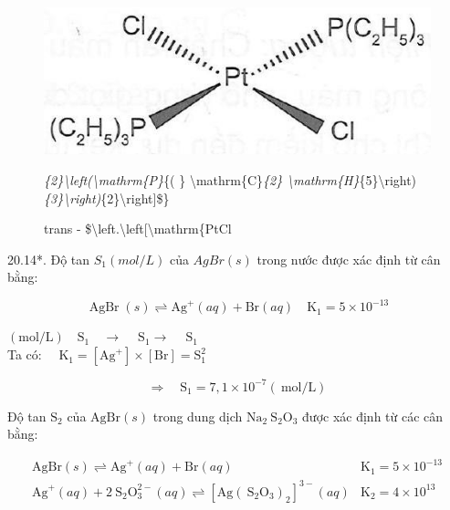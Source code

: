 \documentclass[10pt]{article}
\begin{document}
\begin{figure}[h]
\begin{center}
  \includegraphics[width=\textwidth]{2025_10_23_b4e16b74380d0f7e7700g-119(1)}
\captionsetup{labelformat=empty}
\caption{trans - \$\textbackslash left.\textbackslash left[\textbackslash mathrm\{PtCl}\textit{\{2\}\textbackslash left(\textbackslash mathrm\{P\}}\{( \} \textbackslash mathrm\{C\}\textit{\{2\} \textbackslash mathrm\{H\}}\{5\}\textbackslash right)\textit{\{3\}\textbackslash right)}\{2\}\textbackslash right]\$\}\end{center}
\end{figure}

20.14*. Độ tan $S_{1}(m o l / L)$ của $A g B r(s)$ trong nước được xác định từ cân bằng:

$$
\operatorname{AgBr}(s) \rightleftharpoons \mathrm{Ag}^{+}(a q)+\mathrm{Br}(a q) \quad \mathrm{K}_{1}=5 \times 10^{-13}
$$

$(\mathrm{mol} / \mathrm{L}) \quad \mathrm{S}_{1} \quad \rightarrow \quad \mathrm{~S}_{1} \rightarrow \quad \mathrm{~S}_{1}$\\
Ta có: $\quad \mathrm{K}_{1}=\left[\mathrm{Ag}^{+}\right] \times[\mathrm{Br}]=\mathrm{S}_{1}^{2}$

$$
\Rightarrow \quad \mathrm{S}_{1}=7,1 \times 10^{-7}(\mathrm{~mol} / \mathrm{L})
$$

Độ tan $\mathrm{S}_{2}$ của $\mathrm{AgBr}(s)$ trong dung dịch $\mathrm{Na}_{2} \mathrm{~S}_{2} \mathrm{O}_{3}$ được xác định từ các cân bằng:

$$
\begin{array}{ll}
\mathrm{AgBr}(s) \rightleftharpoons \mathrm{Ag}^{+}(a q)+\mathrm{Br}(a q) & \mathrm{K}_{1}=5 \times 10^{-13} \\
\mathrm{Ag}^{+}(a q)+2 \mathrm{~S}_{2} \mathrm{O}_{3}^{2-}(a q) \rightleftharpoons\left[\mathrm{Ag}\left(\mathrm{~S}_{2} \mathrm{O}_{3}\right)_{2}\right]^{3-}(a q) & \mathrm{K}_{2}=4 \times 10^{13}
\end{array}
$$
\end{document}
